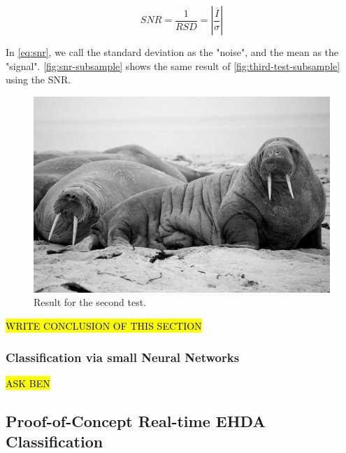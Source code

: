 \documentclass[oneside,12pt]{article}
\begin{document}
\begin{equation} \label{eq:snr}
    SNR = \frac{1}{RSD} = \left|\frac{\overline{I}}{\sigma}\right|
\end{equation}

In \autoref{eq:snr}, we call the standard deviation as the "noise", and the mean as the "signal". \autoref{fig:snr-subsample} shows the
same result of \autoref{fig:third-test-subsample} using the SNR.

\begin{figure}[h!]
    \centering
    \includegraphics[width=.8\textwidth,trim=1 1 1 1,clip]{figures/lorem-picsum.jpg}
    \caption{Result for the second test.}
    \label{fig:snr-subsample}
\end{figure}

\hl{WRITE CONCLUSION OF THIS SECTION}

\subsubsection{Classification via small Neural Networks}

\hl{ASK BEN}

\subsection{Proof-of-Concept Real-time EHDA Classification}
\end{document}
